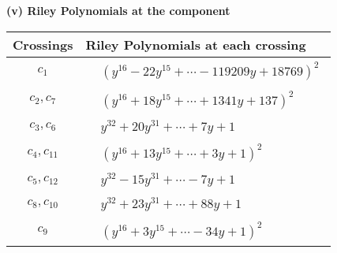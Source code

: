 \documentclass[1p]{elsarticle_modified}
\theoremstyle{definition}
\begin{document}
\newpage\renewcommand{\arraystretch}{1}
\flushleft \textbf{(v) Riley Polynomials at the component}\newline \\
\begin{tabular}{m{50pt}|m{274pt}}
Crossings & \hspace{64pt}Riley Polynomials at each crossing \\
\hline $$\begin{aligned}c_{1}\end{aligned}$$&$\begin{aligned}
&(y^{16}-22 y^{15}+\cdots-119209 y+18769)^{2}
\end{aligned}$\\
\hline $$\begin{aligned}c_{2},c_{7}\end{aligned}$$&$\begin{aligned}
&(y^{16}+18 y^{15}+\cdots+1341 y+137)^{2}
\end{aligned}$\\
\hline $$\begin{aligned}c_{3},c_{6}\end{aligned}$$&$\begin{aligned}
&y^{32}+20 y^{31}+\cdots+7 y+1
\end{aligned}$\\
\hline $$\begin{aligned}c_{4},c_{11}\end{aligned}$$&$\begin{aligned}
&(y^{16}+13 y^{15}+\cdots+3 y+1)^{2}
\end{aligned}$\\
\hline $$\begin{aligned}c_{5},c_{12}\end{aligned}$$&$\begin{aligned}
&y^{32}-15 y^{31}+\cdots-7 y+1
\end{aligned}$\\
\hline $$\begin{aligned}c_{8},c_{10}\end{aligned}$$&$\begin{aligned}
&y^{32}+23 y^{31}+\cdots+88 y+1
\end{aligned}$\\
\hline $$\begin{aligned}c_{9}\end{aligned}$$&$\begin{aligned}
&(y^{16}+3 y^{15}+\cdots-34 y+1)^{2}
\end{aligned}$\\
\hline
\end{tabular}\\~\\
\end{document}
